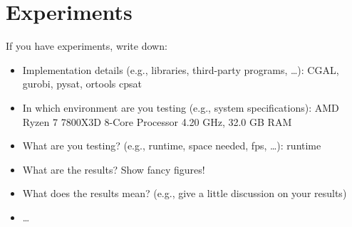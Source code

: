 \chapter{Experiments}
If you have experiments, write down:
\begin{itemize}
	\item Implementation details (e.g., libraries, third-party programs, \dots): CGAL, gurobi, pysat, ortools cpsat
	\item In which environment are you testing (e.g., system specifications): AMD Ryzen 7 7800X3D 8-Core Processor 4.20 GHz, 32.0 GB RAM
	\item What are you testing? (e.g., runtime, space needed, fps, \dots): runtime
	\item What are the results? Show fancy figures!
	\item What does the results mean? (e.g., give a little discussion on your results)
	\item \dots
\end{itemize}